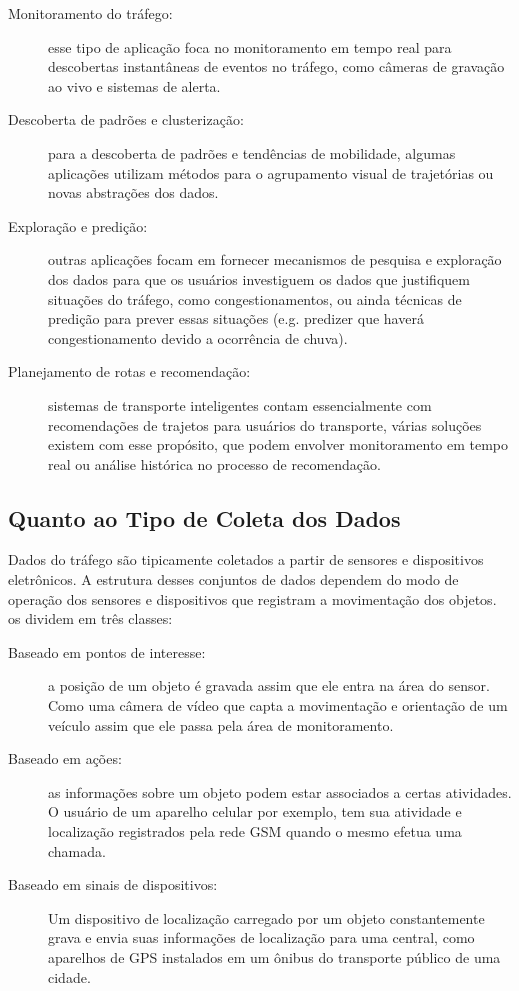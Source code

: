 \begin{description}
  \item[Monitoramento do tráfego:] esse tipo de aplicação
foca no monitoramento em tempo real para descobertas instantâneas de eventos no
tráfego, como câmeras de gravação ao vivo e sistemas de alerta.

  \item[Descoberta de padrões e clusterização:] para a descoberta de padrões e
tendências de mobilidade, algumas aplicações utilizam métodos para o
agrupamento visual de trajetórias ou novas abstrações dos dados.

  \item[Exploração e predição:] outras aplicações focam em fornecer mecanismos
de pesquisa e exploração dos dados para que os usuários investiguem os dados
que justifiquem situações do tráfego, como congestionamentos, ou ainda técnicas
de predição para prever essas situações (e.g. predizer que haverá
congestionamento devido a ocorrência de chuva).

  \item[Planejamento de rotas e recomendação:] sistemas de transporte
inteligentes contam essencialmente com recomendações de trajetos para usuários
do transporte, várias soluções existem com esse propósito, que podem envolver monitoramento
em tempo real ou análise histórica no processo de recomendação.
\end{description}

\subsection{Quanto ao Tipo de Coleta dos Dados}

  Dados do tráfego são tipicamente coletados a partir de sensores e dispositivos
eletrônicos. A estrutura desses conjuntos de dados dependem do modo de operação
dos sensores e dispositivos que registram a movimentação dos objetos. \citet{Chen2015}
os dividem em três classes:

\begin{description}
  \item[Baseado em pontos de interesse:] a posição de um objeto é gravada assim
que ele entra na área do sensor. Como uma câmera de vídeo que capta a
movimentação e orientação de um veículo assim que ele passa pela área de
monitoramento.

  \item[Baseado em ações:] as informações sobre um objeto podem estar associados
a certas atividades. O usuário de um aparelho celular por exemplo, tem sua
atividade e localização registrados pela rede GSM quando o mesmo efetua uma
chamada.

  \item[Baseado em sinais de dispositivos:] Um dispositivo de localização
carregado por um objeto constantemente grava e envia suas informações de
localização para uma central, como aparelhos de GPS instalados em um ônibus do
transporte público de uma cidade.  \end{description}

